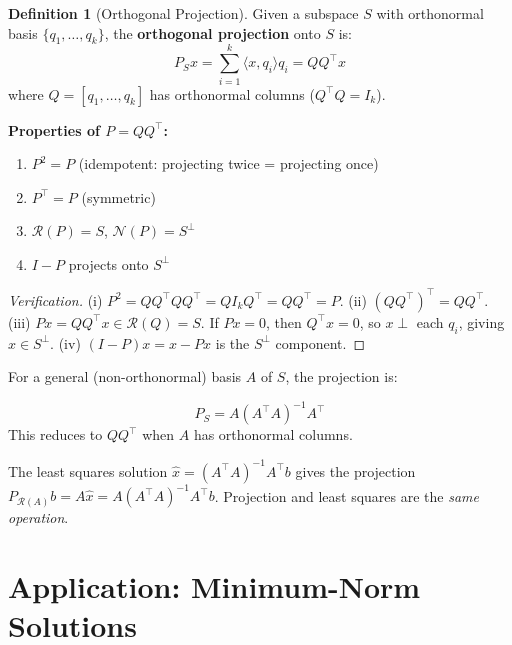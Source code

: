 \documentclass[10pt, twocolumn]{article}
\theoremstyle{definition}
\newtheorem{definition}{Definition}
\theoremstyle{plain}
\newcommand{\NN}{\mathcal{N}}
\newcommand{\Range}{\mathcal{R}}
\begin{document}
\begin{definition}[Orthogonal Projection]
Given a subspace $S$ with orthonormal basis $\{q_1, \ldots, q_k\}$, the \textbf{orthogonal projection} onto $S$ is:
\[
    P_S x = \sum_{i=1}^{k} \langle x, q_i \rangle q_i = QQ^\top x
\]
where $Q = [q_1, \ldots, q_k]$ has orthonormal columns ($Q^\top Q = I_k$).
\end{definition}

\begin{result}
\textbf{Properties of $P = QQ^\top$:}
\begin{enumerate}[label=(\roman*)]
    \item $P^2 = P$ \quad (idempotent: projecting twice = projecting once)
    \item $P^\top = P$ \quad (symmetric)
    \item $\Range(P) = S$, \quad $\NN(P) = S^\perp$
    \item $I - P$ projects onto $S^\perp$
\end{enumerate}
\end{result}

\begin{proof}[Verification]
(i) $P^2 = QQ^\top Q Q^\top = Q I_k Q^\top = QQ^\top = P$. (ii) $(QQ^\top)^\top = QQ^\top$. (iii) $Px = QQ^\top x \in \Range(Q) = S$. If $Px = 0$, then $Q^\top x = 0$, so $x \perp$ each $q_i$, giving $x \in S^\perp$. (iv) $(I-P)x = x - Px$ is the $S^\perp$ component.
\end{proof}

For a general (non-orthonormal) basis $A$ of $S$, the projection is:
\begin{result}
\[
    P_S = A(A^\top A)^{-1}A^\top
\]
This reduces to $QQ^\top$ when $A$ has orthonormal columns.
\end{result}

\begin{tcolorbox}[colframe=black!50, title={\small Connection to Least Squares}]
The least squares solution $\hat{x} = (A^\top A)^{-1}A^\top b$ gives the projection $P_{\Range(A)} b = A\hat{x} = A(A^\top A)^{-1}A^\top b$. Projection and least squares are the \emph{same operation}.
\end{tcolorbox}

\section{Application: Minimum-Norm Solutions}
\end{document}
